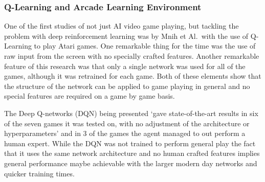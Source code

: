 \documentclass[a4paper]{article}
\begin{document}
\subsubsection{Q-Learning and Arcade Learning Environment}
One of the first studies of not just AI video game playing, but tackling the problem with deep reinforcement learning was by Mnih et Al.\ with the use of Q-Learning to play Atari games.
One remarkable thing for the time was the use of raw input from the screen with no specially crafted features.
Another remarkable feature of this research was that only a single network was used for all of the games, although it was retrained for each game.
Both of these elements show that the structure of the network can be applied to game playing in general and no special features are required on a game by game basis.
\par
The Deep Q-networks (DQN) being presented `gave state-of-the-art results in six of the seven games it was tested on, with no adjustment of the
architecture or hyperparameters'\cite{ALE} and in 3 of the games the agent managed to out perform a human expert.
While the DQN was not trained to perform general play the fact that it uses the same network architecture and no human crafted features implies general performance maybe achievable with the larger modern day networks and quicker training times.
\end{document}
